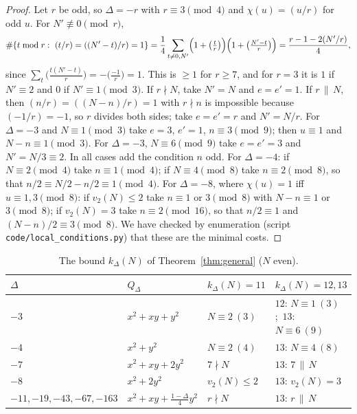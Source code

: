 \documentclass[11pt]{amsart}
\theoremstyle{remark}
\begin{document}
\begin{proof}
Let $r$ be odd, so $\Delta=-r$ with $r\equiv3\pmod4$ and $\chi(u)=(u/r)$ for odd $u$. For $N'\not\equiv0\pmod r$,
\[
\#\{t\bmod r:\ (t/r)=((N'-t)/r)=1\}=\frac14\sum_{t\ne0,N'}\Bigl(1+\bigl(\tfrac tr\bigr)\Bigr)\Bigl(1+\bigl(\tfrac{N'-t}r\bigr)\Bigr)
=\frac{r-1-2(N'/r)}{4},
\]
since $\sum_t\bigl(\frac{t(N'-t)}r\bigr)=-\bigl(\frac{-1}r\bigr)=1$. This is $\ge1$ for $r\ge7$, and for $r=3$ it is
$1$ if $N'\equiv2$ and $0$ if $N'\equiv1\pmod 3$. If $r\nmid N$, take $N'=N$ and $e=e'=1$. If $r\,\|\,N$, then
$(n/r)=((N-n)/r)=1$ with $r\nmid n$ is impossible because $(-1/r)=-1$, so $r$ divides both sides; take $e=e'=r$
and $N'=N/r$. For $\Delta=-3$ and $N\equiv1\pmod3$ take $e=3$, $e'=1$, $n\equiv3\pmod9$; then
$u\equiv1$ and $N-n\equiv1\pmod 3$. For $\Delta=-3$, $N\equiv6\pmod9$ take $e=e'=3$ and $N'=N/3\equiv2$. In all
cases add the condition $n$ odd. For $\Delta=-4$: if $N\equiv2\pmod4$ take $n\equiv1\pmod4$; if $N\equiv4\pmod 8$
take $n\equiv2\pmod8$, so that $n/2\equiv N/2-n/2\equiv1\pmod4$. For $\Delta=-8$, where $\chi(u)=1$ iff
$u\equiv1,3\pmod 8$: if $v_2(N)\le2$ take $n\equiv1$ or $3\pmod 8$ with $N-n\equiv1$ or $3\pmod8$; if
$v_2(N)=3$ take $n\equiv2\pmod{16}$, so that $n/2\equiv1$ and $(N-n)/2\equiv3\pmod 8$. We have checked by
enumeration (script \texttt{code/local\_conditions.py}) that these are the minimal costs.
\end{proof}

\begin{table}[t]
\centering
\small
\begin{tabular}{llll}
\hline
$\Delta$ & $Q_\Delta$ & $k_\Delta(N)=11$ & $k_\Delta(N)=12,13$\\
\hline
$-3$ & $x^2+xy+y^2$ & $N\equiv2\ (3)$ & $12$: $N\equiv1\ (3)$;\ $13$: $N\equiv6\ (9)$\\
$-4$ & $x^2+y^2$ & $N\equiv2\ (4)$ & $13$: $N\equiv4\ (8)$\\
$-7$ & $x^2+xy+2y^2$ & $7\nmid N$ & $13$: $7\,\|\,N$\\
$-8$ & $x^2+2y^2$ & $v_2(N)\le2$ & $13$: $v_2(N)=3$\\
$-11,-19,-43,-67,-163$ & $x^2+xy+\frac{1-\Delta}{4}y^2$ & $r\nmid N$ & $13$: $r\,\|\,N$\\
\hline
\end{tabular}
\medskip
\caption{The bound $k_\Delta(N)$ of Theorem~\ref{thm:general} ($N$ even).}
\label{tab:general}
\end{table}
\end{document}
